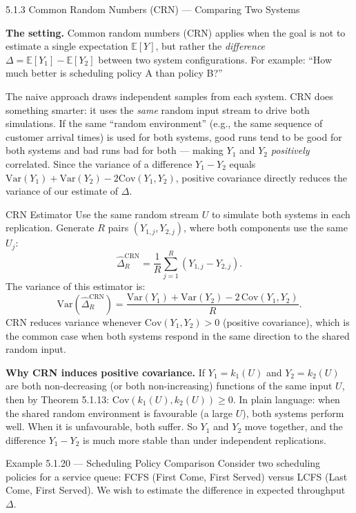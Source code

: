 \documentclass[aspectratio=169,10pt]{beamer}
\begin{document}
\begin{frame}[allowframebreaks]{5.1.3 Common Random Numbers (CRN) --- Comparing Two Systems}

\textbf{The setting.}
Common random numbers (CRN) applies when the goal is not to estimate a single
expectation $\mathbb{E}[Y]$, but rather the \emph{difference}
$\Delta = \mathbb{E}[Y_1] - \mathbb{E}[Y_2]$ between two system configurations.
For example: ``How much better is scheduling policy A than policy B?''

The naive approach draws independent samples from each system.
CRN does something smarter: it uses the \emph{same} random input stream to
drive both simulations.  If the same ``random environment'' (e.g., the same
sequence of customer arrival times) is used for both systems, good runs tend
to be good for both systems and bad runs bad for both --- making $Y_1$ and
$Y_2$ \emph{positively} correlated.  Since the variance of a difference
$Y_1 - Y_2$ equals $\mathrm{Var}(Y_1) + \mathrm{Var}(Y_2) - 2\mathrm{Cov}(Y_1, Y_2)$,
positive covariance directly reduces the variance of our estimate of $\Delta$.

\begin{block}{CRN Estimator}
  Use the same random stream $U$ to simulate both systems in each replication.
  Generate $R$ pairs $(Y_{1,j}, Y_{2,j})$, where both components use the same $U_j$:
  \[
    \hat{\Delta}_R^{\mathrm{CRN}} = \frac{1}{R}\sum_{j=1}^R (Y_{1,j} - Y_{2,j}).
  \]
  The variance of this estimator is:
  \[
    \mathrm{Var}(\hat{\Delta}_R^{\mathrm{CRN}})
    = \frac{\mathrm{Var}(Y_1) + \mathrm{Var}(Y_2) - 2\,\mathrm{Cov}(Y_1,Y_2)}{R}.
  \]
  CRN reduces variance whenever $\mathrm{Cov}(Y_1, Y_2) > 0$ (positive covariance),
  which is the common case when both systems respond in the same direction to
  the shared random input.
\end{block}

\framebreak

\textbf{Why CRN induces positive covariance.}
If $Y_1 = k_1(U)$ and $Y_2 = k_2(U)$ are both non-decreasing (or both
non-increasing) functions of the same input $U$, then by Theorem 5.1.13:
$\mathrm{Cov}(k_1(U), k_2(U)) \ge 0$.
In plain language: when the shared random environment is favourable (a
large $U$), both systems perform well.  When it is unfavourable, both suffer.
So $Y_1$ and $Y_2$ move together, and the difference $Y_1 - Y_2$ is much more
stable than under independent replications.

\begin{exampleblock}{Example 5.1.20 --- Scheduling Policy Comparison}
  Consider two scheduling policies for a service queue: FCFS (First Come,
  First Served) versus LCFS (Last Come, First Served).
  We wish to estimate the difference in expected throughput $\Delta$.


\end{exampleblock}
\end{frame}
\end{document}
